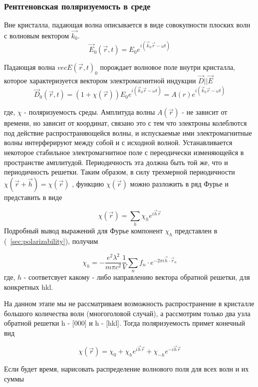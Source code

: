 \subsubsection{Рентгеновская поляризуемость в среде}

Вне кристалла, падающая волна описывается в виде совокупности плоских волн с волновым вектором  $\vec{k_0}$.
\begin{equation}
  \vec{E}_0(\vec{r},t) = E_0 e^{i(\vec{k}_0\vec{r}-\omega t)}
 \end{equation}

Падающая волна $vec{E}(\vec{r},t)_0$ порождает волновое поле внутри кристалла, которое характеризуется вектором
электромагнитной индукции $\vec{D}||\vec{E}$
\begin{equation}
 \vec{D}_0(\vec{r},t) = (1+\chi(\vec{r})) E_0 e^{i(\vec{k}_0\vec{r}-\omega t)} = A(r) e^{i(\vec{k}_0\vec{r}-\omega t)}
\end{equation}

где, $\chi$ - поляризуемость среды. Амплитуда волны $A(\vec{r})$ - не зависит
от времени, но зависит от координат, связано
это с тем что электроны колеблются под действие распространяющейся волны, и испускаемые ими
электромагнитные волны интерферируют между собой и с исходной волной. Устанавливается некоторое стабильное
электромагнитное поле с переодически изменяющейся в пространстве амплитудой. Периодичность эта должна быть
той же, что и периодичность решетки. Таким образом, в силу трехмерной периодичности $\chi(\vec{r}+\vec{h}) = \chi(\vec{r})$
, функцию $\chi(\vec{r})$ можно разложить в ряд Фурье и представить в виде

\begin{equation}
\chi(\vec{r}) = \sum_{h}\chi_h e^{i\vec{h}\vec{r}}
\end{equation}
Подробный вывод выражений для Фурье компонент $\chi_h$ представлен в (~\ref{sec:polarizability}), получим


\begin{equation}
\chi_h = -\frac{e^2 \lambda^2}{m \pi c^2} \frac{1}{V} \sum_{n} f_n \cdot e^{-2\pi i\vec{h}\cdot \vec{r}_n}
\end{equation}
где, $h$ - соответсвует какому - либо направлению вектора обратной решетки, для конкретных {hkl}.

На данном этапе мы не рассматриваем возможность распространение в кристалле большого количества
волн (многоголовой случай), а рассмотрим только два узла обратной решетки h - [000] и h - [hkl].
Тогда поляризуемость примет конечный вид

\begin{equation}
\chi(\vec{r}) = \chi_0 + \chi_h e^{i\vec{h}\vec{r}} + \chi_{-h} e^{-i\vec{h}\vec{r}}
\end{equation}

\textcolor{mygreen}{Если будет время, нарисовать распределение волнового поля для всех волн и их суммы}
